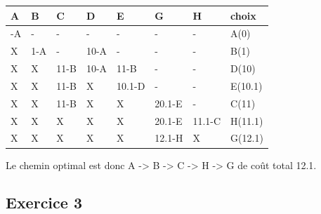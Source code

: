 \documentclass[
  letterpaper,
  DIV=11,
  numbers=noendperiod]{scrartcl}
\begin{document}
\begin{enumerate}
\begin{enumerate}
    \begin{longtable}[]{@{}llllllll@{}}
    \toprule\noalign{}
    A & B & C & D & E & G & H & choix \\
    \midrule\noalign{}
    \endhead
    \bottomrule\noalign{}
    \endlastfoot
    0-A & - & - & - & - & - & - & A(0) \\
    X & 1-A & - & 10-A & - & - & - & B(1) \\
    X & X & 11-B & 10-A & 11-B & - & - & D(10) \\
    X & X & 11-B & X & 10.1-D & - & - & E(10.1) \\
    X & X & 11-B & X & X & 20.1-E & - & C(11) \\
    X & X & X & X & X & 20.1-E & 11.1-C & H(11.1) \\
    X & X & X & X & X & 12.1-H & X & G(12.1) \\
    \end{longtable}

    Le chemin optimal est donc A -\textgreater{} B -\textgreater{} C
    -\textgreater{} H -\textgreater{} G de coût total 12.1.
  \end{enumerate}
\end{enumerate}

\hypertarget{exercice-3}{%
\subsection{Exercice 3}\label{exercice-3}}
\end{document}
